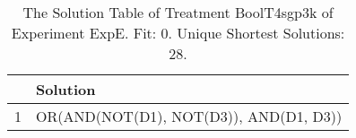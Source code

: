 \begin{table}[ht]
\centering
\begin{tabular}{rp{9cm}}
  \hline
 & Solution \\ 
  \hline
1 & OR(AND(NOT(D1), NOT(D3)), AND(D1, D3)) \\ 
   \hline
\end{tabular}
\caption{The Solution Table of Treatment BoolT4sgp3k of Experiment ExpE. Fit: 0. Unique Shortest Solutions: 28.} 
\end{table}
